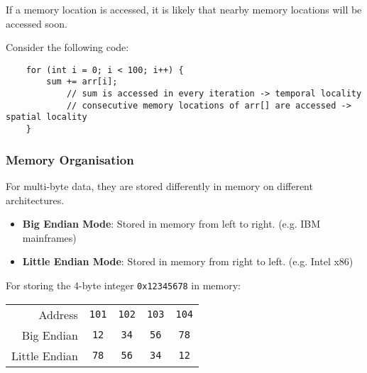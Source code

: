 \begin{definition}
    If a memory location is accessed, it is likely that nearby memory locations
    will be accessed soon.
\end{definition}

\begin{example}
    Consider the following code:
\begin{verbatim}
    for (int i = 0; i < 100; i++) {
        sum += arr[i];
            // sum is accessed in every iteration -> temporal locality
            // consecutive memory locations of arr[] are accessed -> spatial locality
    }
\end{verbatim}
\end{example}

\subsubsection{Memory Organisation}

For multi-byte data, they are stored differently in memory on different architectures.
\begin{itemize}
    \item \textbf{Big Endian Mode}: Stored in memory from left to right. (e.g. IBM mainframes)
    \item \textbf{Little Endian Mode}: Stored in memory from right to left. (e.g. Intel x86)
\end{itemize}

\begin{example}
    For storing the 4-byte integer \texttt{0x12345678} in memory:
    \begin{table}[H]
        \centering
        \begin{tabular}{rcccc}
        Address                            & \texttt{101}                     & \texttt{102}                     & \texttt{103}                     & \texttt{104}                     \\ \cline{2-5} 
        \multicolumn{1}{r|}{Big Endian}    & \multicolumn{1}{c|}{\texttt{12}} & \multicolumn{1}{c|}{\texttt{34}} & \multicolumn{1}{c|}{\texttt{56}} & \multicolumn{1}{c|}{\texttt{78}} \\ \cline{2-5} 
        \multicolumn{1}{r|}{Little Endian} & \multicolumn{1}{c|}{\texttt{78}} & \multicolumn{1}{c|}{\texttt{56}} & \multicolumn{1}{c|}{\texttt{34}} & \multicolumn{1}{c|}{\texttt{12}} \\ \cline{2-5} 
        \end{tabular}
    \end{table}
\end{example}

